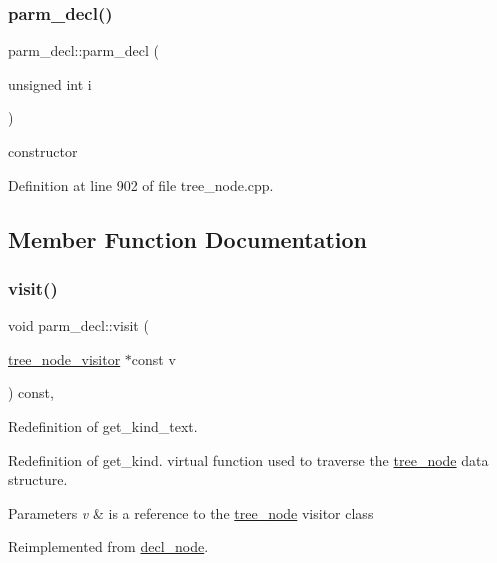 \subsubsection{\texorpdfstring{parm\+\_\+decl()}{parm\_decl()}}
{\footnotesize\ttfamily parm\+\_\+decl\+::parm\+\_\+decl (\begin{DoxyParamCaption}\item[{unsigned int}]{i }\end{DoxyParamCaption})\hspace{0.3cm}{\ttfamily [explicit]}}



constructor 



Definition at line 902 of file tree\+\_\+node.\+cpp.



\subsection{Member Function Documentation}
\mbox{\label{structparm__decl_ac4757bda05ed450b912bfa0b3ed6bc6c}} 
\subsubsection{\texorpdfstring{visit()}{visit()}}
{\footnotesize\ttfamily void parm\+\_\+decl\+::visit (\begin{DoxyParamCaption}\item[{\hyperlink{classtree__node__visitor}{tree\+\_\+node\+\_\+visitor} $\ast$const}]{v }\end{DoxyParamCaption}) const\hspace{0.3cm}{\ttfamily [override]}, {\ttfamily [virtual]}}



Redefinition of get\+\_\+kind\+\_\+text. 

Redefinition of get\+\_\+kind. virtual function used to traverse the \hyperlink{classtree__node}{tree\+\_\+node} data structure. 
\begin{DoxyParams}{Parameters}
{\em v} & is a reference to the \hyperlink{classtree__node}{tree\+\_\+node} visitor class \\
\hline
\end{DoxyParams}


Reimplemented from \hyperlink{structdecl__node_a9e63331f0c35d9af9d1997afafe9152a}{decl\+\_\+node}.



